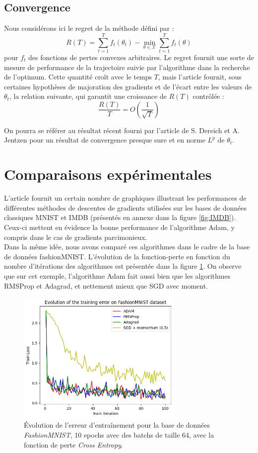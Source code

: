 \documentclass[11pt,a4paper, french]{article}
\newcommand{\dsum}[2]{\displaystyle\sum_{#1}^{#2}}
\theoremstyle{definition}
\begin{document}
\subsection{Convergence}

Nous considérons ici le regret de la méthode défini par : 
$$R(T)=\dsum{t=1}Tf_t(\theta_t)-\min_{\theta\in\mathcal X}\dsum{t=1}Tf_t(\theta)$$
pour $f_t$ des fonctions de pertes convexes arbitraires. Le regret fournit une sorte de mesure de performance de la trajectoire suivie par l'algorithme dans la recherche de l'optimum. Cette quantité croît avec le temps $T$, mais l'article fournit, sous certaines hypothèses de majoration des gradients et de l'écart entre les valeurs de $\theta_t$,  la relation suivante, qui garantit une croissance de $R(T)$ contrôlée :
$$\dfrac{R(T)}{T}=O\left(\dfrac 1{\sqrt T}\right)$$

On pourra se référer au résultat récent fourni par l'article de S. Dereich et A. Jentzen \cite{dereich2024convergenceratesadamoptimizer} pour un résultat de convergence presque sure et en norme $L^p$ de $\theta_t$. 

\section{Comparaisons expérimentales}
L'article fournit un certain nombre de graphiques illustrant les performances de différentes méthodes de descentes de gradients utilisées sur les bases de données classiques MNIST et IMDB (présentés en annexe dans la figure \ref{fig:IMDB}). Ceux-ci mettent en évidence la bonne performance de l'algorithme Adam, y compris dans le cas de gradients parcimonieux. \\
Dans la même idée, nous avons comparé ces algorithmes dans le cadre de la base de données fashionMNIST. L'évolution de la fonction-perte en fonction du nombre d'itérations des algorithmes est présentée dans la figure \ref{fig1}. On observe que sur cet exemple, l'algorithme Adam fait aussi bien que les algorithmes RMSProp et Adagrad, et nettement mieux que SGD avec moment. 



\begin{figure}[H]
\centering
 \includegraphics[width=8cm]{Images/FashionMNIST.png}
\caption{Évolution de l'erreur d'entraînement pour la base de données \textit{FashionMNIST}, 10 epochs avec des batchs de taille 64, avec la fonction de perte \textit{Cross Entropy}.}
\label{fig1}
\end{figure}
\end{document}
